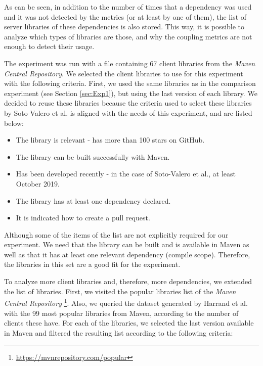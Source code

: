 As can be seen, in addition to the number of times that a dependency was used and it was not detected by the metrics (or at least by one of them), the list of server libraries of these dependencies is also stored. This way, it is possible to analyze which types of libraries are those, and why the coupling metrics are not enough to detect their usage.

\blankl
The experiment was run with a file containing 67 client libraries from the \textit{Maven Central Repository}.  We selected the client libraries to use for this experiment with the following criteria. First, we used the same libraries as in the comparison experiment (see Section \ref{sec:Exp1}), but using the last version of each library. We decided to reuse these libraries because the criteria used to select these libraries by Soto-Valero et al. \cite{soto2020comprehensive} is aligned with the needs of this experiment, and are listed below:

\begin{itemize}
  \item The library is relevant - has more than 100 stars on GitHub.
  \item The library can be built successfully with Maven.
  \item Has been developed recently - in the case of Soto-Valero et al., at least October 2019.
  \item The library has at least one dependency declared.
  \item It is indicated how to create a pull request.
\end{itemize}

Although some of the items of the list are not explicitly required for our experiment. We need that the library can be built and is available in Maven as well as that it has at least one relevant dependency (compile scope). Therefore, the libraries in this set are a good fit for the experiment.

To analyze more client libraries and, therefore, more dependencies, we extended the list of libraries. First, we visited the popular libraries list of the \textit{Maven Central Repository} \footnote{\url{https://mvnrepository.com/popular}}. Also, we queried the dataset generated by Harrand et al. \cite{Harrand2019} with the 99 most popular libraries from Maven, according to the number of clients these have. For each of the libraries, we selected the last version available in Maven and filtered the resulting list according to the following criteria:

